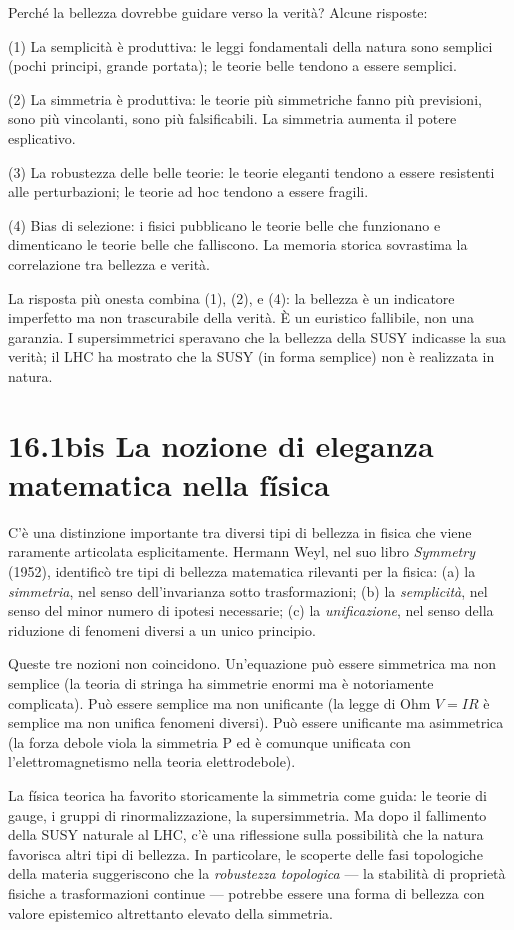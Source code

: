 \documentclass[11.5pt,a4paper,openany]{book}
\theoremstyle{remark}
\begin{document}
Perché la bellezza dovrebbe guidare verso la verità? Alcune risposte:

(1) La semplicità è produttiva: le leggi fondamentali della natura sono semplici (pochi principi, grande portata); le teorie belle tendono a essere semplici.

(2) La simmetria è produttiva: le teorie più simmetriche fanno più previsioni, sono più vincolanti, sono più falsificabili. La simmetria aumenta il potere esplicativo.

(3) La robustezza delle belle teorie: le teorie eleganti tendono a essere resistenti alle perturbazioni; le teorie ad hoc tendono a essere fragili.

(4) Bias di selezione: i fisici pubblicano le teorie belle che funzionano e dimenticano le teorie belle che falliscono. La memoria storica sovrastima la correlazione tra bellezza e verità.

La risposta più onesta combina (1), (2), e (4): la bellezza è un indicatore imperfetto ma non trascurabile della verità. È un euristico fallibile, non una garanzia. I supersimmetrici speravano che la bellezza della SUSY indicasse la sua verità; il LHC ha mostrato che la SUSY (in forma semplice) non è realizzata in natura.

\section{16.1bis La nozione di eleganza matematica nella física}

C'è una distinzione importante tra diversi tipi di bellezza in fisica che viene raramente articolata esplicitamente. Hermann Weyl, nel suo libro \textit{Symmetry} (1952), identificò tre tipi di bellezza matematica rilevanti per la fisica: (a) la \textit{simmetria}, nel senso dell'invarianza sotto trasformazioni; (b) la \textit{semplicità}, nel senso del minor numero di ipotesi necessarie; (c) la \textit{unificazione}, nel senso della riduzione di fenomeni diversi a un unico principio.

Queste tre nozioni non coincidono. Un'equazione può essere simmetrica ma non semplice (la teoria di stringa ha simmetrie enormi ma è notoriamente complicata). Può essere semplice ma non unificante (la legge di Ohm $V = IR$ è semplice ma non unifica fenomeni diversi). Può essere unificante ma asimmetrica (la forza debole viola la simmetria P ed è comunque unificata con l'elettromagnetismo nella teoria elettrodebole).

La física teorica ha favorito storicamente la simmetria come guida: le teorie di gauge, i gruppi di rinormalizzazione, la supersimmetria. Ma dopo il fallimento della SUSY naturale al LHC, c'è una riflessione sulla possibilità che la natura favorisca altri tipi di bellezza. In particolare, le scoperte delle fasi topologiche della materia suggeriscono che la \textit{robustezza topologica} --- la stabilità di proprietà fisiche a trasformazioni continue --- potrebbe essere una forma di bellezza con valore epistemico altrettanto elevato della simmetria.
\end{document}
